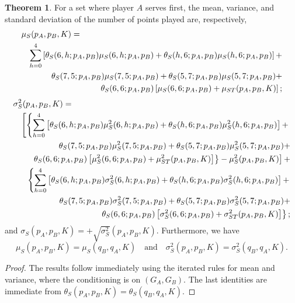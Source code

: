 \documentclass[11pt]{article}
\theoremstyle{plain}
\theoremstyle{definition}
\newtheorem{theorem}{Theorem}[section]
\begin{document}
\begin{theorem}
    For a set where player $A$ serves first, the mean, variance, and standard deviation of the number of points played are, respectively,
    \begin{eqnarray*}
       \lefteqn{ \mu_S(p_A,p_B,K)  = } \\ && \sum_{h=0}^4
        \left[\theta_S(6,h;p_A,p_B) \mu_S(6,h;p_A,p_B) + \theta_S(h,6;p_A,p_B) \mu_S(h,6;p_A,p_B)\right] + \\
        &&  \theta_S(7,5;p_A,p_B) \mu_S(7,5;p_A,p_B) + \theta_S(5,7;p_A,p_B) \mu_S(5,7;p_A,p_B) + \\
        && \theta_S(6,6;p_A,p_B)\left[\mu_S(6,6;p_A,p_B) + \mu_{ST}(p_A,p_B,K)\right];
    \end{eqnarray*}
    \begin{eqnarray*}
        \lefteqn{ \sigma_S^2(p_A,p_B,K)  = } \\ &&
        \left[ \left\{ \sum_{h=0}^4
        \left[\theta_S(6,h;p_A,p_B) \mu_S^2(6,h;p_A,p_B) + \theta_S(h,6;p_A,p_B) \mu_S^2(h,6;p_A,p_B)\right] + \right.\right. \\
        &&  \theta_S(7,5;p_A,p_B) \mu_S^2(7,5;p_A,p_B) + \theta_S(5,7;p_A,p_B) \mu_S^2(5,7;p_A,p_B) + \\
        && \left.\left. \theta_S(6,6;p_A,p_B)\left[\mu_S^2(6,6;p_A,p_B) + \mu_{ST}^2(p_A,p_B,K)\right] \right\} - \mu_S^2(p_A,p_B,K)\right] + \\ 
        && \left\{ \sum_{h=0}^4
        \left[ \theta_S(6,h;p_A,p_B) \sigma_S^2(6,h;p_A,p_B) + \theta_S(h,6;p_A,p_B) \sigma_S^2(h,6;p_A,p_B)\right] + \right. \\
        &&  \theta_S(7,5;p_A,p_B) \sigma_S^2(7,5;p_A,p_B) + \theta_S(5,7;p_A,p_B) \sigma_S^2(5,7;p_A,p_B) + \\
        && \left. \theta_S(6,6;p_A,p_B)\left[\sigma_S^2(6,6;p_A,p_B) + \sigma_{ST}^2(p_A,p_B,K)\right] \right\}; 
    \end{eqnarray*}
    and $\sigma_S(p_A,p_B,K) = +\sqrt{\sigma_S^2}(p_A,p_B,K)$.
    Furthermore, we have
    $$\mu_S(p_A,p_B,K) = \mu_S(q_B,q_A,K) \quad \mbox{and} \quad \sigma_S^2(p_A,p_B,K) = \sigma_S^2(q_B,q_A,K).$$
\end{theorem}

\begin{proof}
The results follow immediately using the iterated rules for mean and variance, where the conditioning is on $(G_A,G_B)$. The last identities are immediate from $\theta_S(p_A,p_B,K) = \theta_S(q_B,q_A,K)$.
\end{proof}
\end{document}
